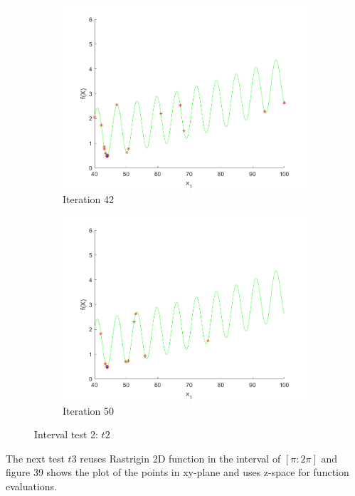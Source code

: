 \begin{figure}
\begin{subfigure}[b]{0.4\textwidth}
   \includegraphics[width=\textwidth]{img/smpl/grwnk1dshft/loa-iter-42}
   \caption{Iteration 42}
   \label{fig:i2-iter-6}
 \end{subfigure}
 \begin{subfigure}[b]{0.4\textwidth}
   \includegraphics[width=\textwidth]{img/smpl/grwnk1dshft/loa-iter-50}
   \caption{Iteration 50}
   \label{fig:i2-iter-7}
 \end{subfigure}
 \caption{Interval test 2: $t2$}
\end{figure}

\par The next test $t3$ reuses Rastrigin 2D function in the interval of $[\pi:2\pi]$ and figure 39 shows the plot of the points in xy-plane and uses z-space for function evaluations.

